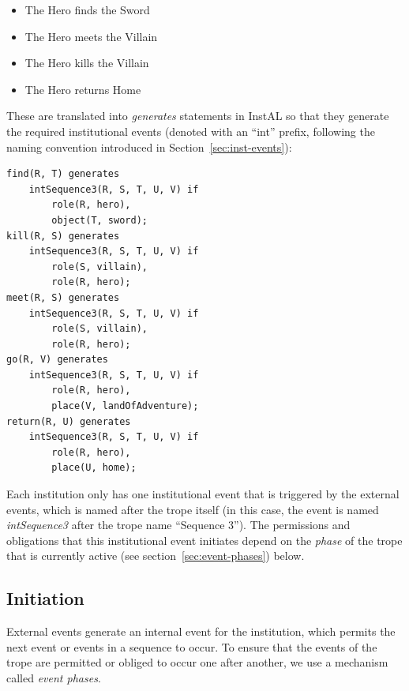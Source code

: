 \documentclass[11pt]{report}
\begin{document}
\begin{itemize}
  \item The Hero finds the Sword
  \item The Hero meets the Villain
  \item The Hero kills the Villain
  \item The Hero returns Home
\end{itemize}

These are translated into \emph{generates} statements in InstAL so that they
generate the required institutional events (denoted with an ``int''
prefix, following the naming convention introduced in
Section~\ref{sec:inst-events}):

\begin{lstlisting}[showstringspaces=false, label={lst:instal-generates},
caption={InstAL code resulting from the compilation of Listing~\ref{lst:seq4}}]
find(R, T) generates
    intSequence3(R, S, T, U, V) if
        role(R, hero),
        object(T, sword);
kill(R, S) generates
    intSequence3(R, S, T, U, V) if
        role(S, villain),
        role(R, hero);
meet(R, S) generates
    intSequence3(R, S, T, U, V) if
        role(S, villain),
        role(R, hero);
go(R, V) generates
    intSequence3(R, S, T, U, V) if
        role(R, hero),
        place(V, landOfAdventure);
return(R, U) generates
    intSequence3(R, S, T, U, V) if
        role(R, hero),
        place(U, home);
\end{lstlisting}

Each institution only has one institutional event that is triggered by the
external events, which is named after the trope itself (in this case, the event
is named \emph{intSequence3} after the trope name ``Sequence 3''). The
permissions and obligations that this institutional event initiates depend on
the \emph{phase} of the trope that is currently active (see
section~\ref{sec:event-phases}) below.

\subsection{Initiation}
\label{sec:anat-init}

External events generate an internal event for the institution, which permits
the next event or events in a sequence to occur. To ensure that the events of
the trope are permitted or obliged to occur one after another, we use a
mechanism called \emph{event phases}.
\end{document}
